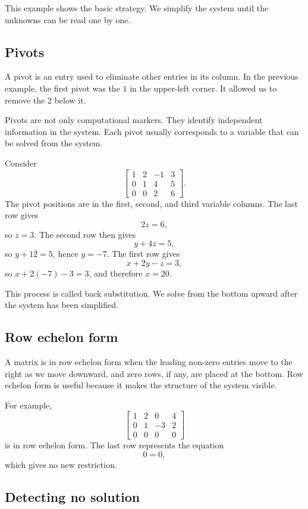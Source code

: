 This example shows the basic strategy. We simplify the system until the unknowns can be read one by one.

\subsection*{Pivots}

A pivot is an entry used to eliminate other entries in its column. In the previous example, the first pivot was the \(1\) in the upper-left corner. It allowed us to remove the \(2\) below it.

Pivots are not only computational markers. They identify independent information in the system. Each pivot usually corresponds to a variable that can be solved from the system.

\begin{examplebox}
Consider
\[
\left[
\begin{array}{ccc|c}
1&2&-1&3\\
0&1&4&5\\
0&0&2&6
\end{array}
\right].
\]
The pivot positions are in the first, second, and third variable columns. The last row gives
\[
2z=6,
\]
so \(z=3\). The second row then gives
\[
y+4z=5,
\]
so \(y+12=5\), hence \(y=-7\). The first row gives
\[
x+2y-z=3,
\]
so \(x+2(-7)-3=3\), and therefore \(x=20\).
\end{examplebox}

This process is called back substitution. We solve from the bottom upward after the system has been simplified.

\subsection*{Row echelon form}

A matrix is in row echelon form when the leading non-zero entries move to the right as we move downward, and zero rows, if any, are placed at the bottom. Row echelon form is useful because it makes the structure of the system visible.

For example,
\[
\left[
\begin{array}{ccc|c}
1&2&0&4\\
0&1&-3&2\\
0&0&0&0
\end{array}
\right]
\]
is in row echelon form. The last row represents the equation
\[
0=0,
\]
which gives no new restriction.

\subsection*{Detecting no solution}

